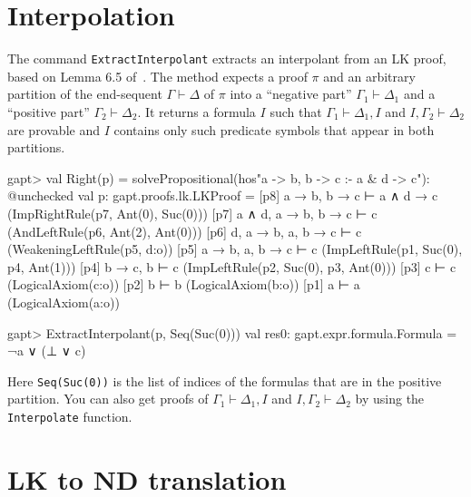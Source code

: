 \documentclass[a4paper,11pt]{book}
\newcommand{\seq}{\vdash}	%
\begin{document}
\section{Interpolation}

The command \texttt{ExtractInterpolant} extracts an interpolant from an LK
proof, based on Lemma 6.5 of~\cite{Takeuti87Proof}.  The method expects a proof
$\pi$ and an arbitrary partition of the end-sequent $\Gamma \seq \Delta$ of
$\pi$ into a ``negative part'' $\Gamma_1\seq\Delta_1$ and a ``positive part''
$\Gamma_2 \seq \Delta_2$.  It returns a formula $I$ such that
$\Gamma_1\seq\Delta_1, I$ and $I,\Gamma_2\seq\Delta_2$ are provable and $I$
contains only such predicate symbols that appear in both partitions.

\begin{clilisting}
gapt> val Right(p) = solvePropositional(hos"a -> b, b -> c :- a & d -> c"): @unchecked
val p: gapt.proofs.lk.LKProof = [p8] a → b, b → c ⊢ a ∧ d → c    (ImpRightRule(p7, Ant(0), Suc(0)))
[p7] a ∧ d, a → b, b → c ⊢ c    (AndLeftRule(p6, Ant(2), Ant(0)))
[p6] d, a → b, a, b → c ⊢ c    (WeakeningLeftRule(p5, d:o))
[p5] a → b, a, b → c ⊢ c    (ImpLeftRule(p1, Suc(0), p4, Ant(1)))
[p4] b → c, b ⊢ c    (ImpLeftRule(p2, Suc(0), p3, Ant(0)))
[p3] c ⊢ c    (LogicalAxiom(c:o))
[p2] b ⊢ b    (LogicalAxiom(b:o))
[p1] a ⊢ a    (LogicalAxiom(a:o))

gapt> ExtractInterpolant(p, Seq(Suc(0)))
val res0: gapt.expr.formula.Formula = ¬a ∨ (⊥ ∨ c)

\end{clilisting}

Here \texttt{Seq(Suc(0))} is the list of indices of the formulas that are in
the positive partition.  You can also get proofs of $\Gamma_1 \vdash \Delta_1,
  I$ and $I, \Gamma_2 \vdash \Delta_2$ by using the \texttt{Interpolate}
function.

\section{LK to ND translation}
\end{document}
